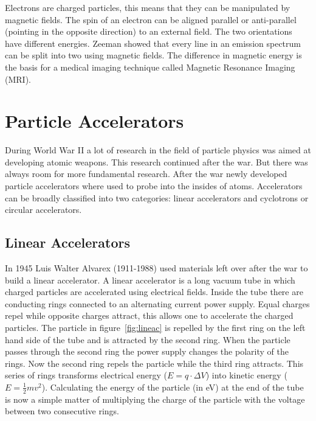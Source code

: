 \documentclass[12pt,a4paper]{article}
\numberwithin{equation}{section}
\numberwithin{figure}{section}
\numberwithin{table}{section}
\begin{document}
Electrons are charged particles, this means that they can be manipulated by magnetic fields. The spin of an electron can be aligned parallel or anti-parallel (pointing in the opposite direction) to an external field. The two orientations have different energies. Zeeman showed that every line in an emission spectrum can be split into two using magnetic fields. The difference in magnetic energy is the basis for a medical imaging technique called Magnetic Resonance Imaging (MRI).

\section{Particle Accelerators}
During World War II a lot of research in the field of particle physics was aimed at developing atomic weapons. This research continued after the war. But there was always room for more fundamental research. After the war newly developed particle accelerators where used to probe into the insides of atoms. Accelerators can be broadly classified into two categories: linear accelerators and cyclotrons or circular accelerators.

\subsection{Linear Accelerators}
In 1945 Luis Walter Alvarex (1911-1988) used materials left over after the war to build a linear accelerator. A linear accelerator is a long vacuum tube in which charged particles are accelerated using electrical fields. Inside the tube there are conducting rings connected to an alternating current power supply. Equal charges repel while opposite charges attract, this allows one to accelerate the charged particles. The particle in figure~\ref{fig:lineac} is repelled by the first ring on the left hand side of the tube and is attracted by the second ring. When the particle passes through the second ring the power supply changes the polarity of the rings. Now the second ring repels the particle while the third ring attracts. This series of rings transforms electrical energy ($E=q \cdot \Delta V$) into kinetic energy ($E= \frac{1}{2}mv^2$). Calculating the energy of the particle (in eV) at the end of the tube is now a simple matter of multiplying the charge of the particle with the voltage between two consecutive rings.
\end{document}
